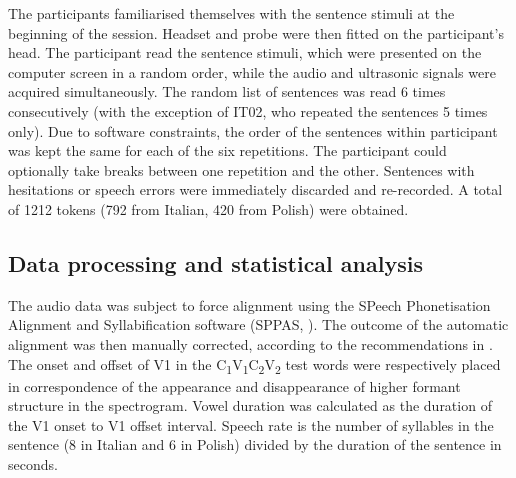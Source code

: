 \documentclass[12pt,]{article}
\begin{document}
The participants familiarised themselves with the sentence stimuli at
the beginning of the session. Headset and probe were then fitted on the
participant's head. The participant read the sentence stimuli, which
were presented on the computer screen in a random order, while the audio
and ultrasonic signals were acquired simultaneously. The random list of
sentences was read 6 times consecutively (with the exception of IT02,
who repeated the sentences 5 times only). Due to software constraints,
the order of the sentences within participant was kept the same for each
of the six repetitions. The participant could optionally take breaks
between one repetition and the other. Sentences with hesitations or
speech errors were immediately discarded and re-recorded. A total of
1212 tokens (792 from Italian, 420 from Polish) were obtained.

\hypertarget{data-processing-and-statistical-analysis}{%
\subsection{Data processing and statistical
analysis}\label{data-processing-and-statistical-analysis}}

\label{s:process}

The audio data was subject to force alignment using the SPeech
Phonetisation Alignment and Syllabification software (SPPAS,
\citealt{bigi2015}). The outcome of the automatic alignment was then
manually corrected, according to the recommendations in
\citet{machac2009}. The onset and offset of V1 in the
C\textsubscript{1}V\textsubscript{1}C\textsubscript{2}V\textsubscript{2}
test words were respectively placed in correspondence of the appearance
and disappearance of higher formant structure in the spectrogram. Vowel
duration was calculated as the duration of the V1 onset to V1 offset
interval. Speech rate is the number of syllables in the sentence (8 in
Italian and 6 in Polish) divided by the duration of the sentence in
seconds.
\end{document}
